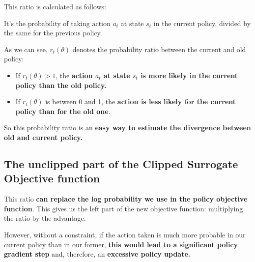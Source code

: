 \documentclass[11pt,a4paper]{article}
\begin{document}
This ratio is calculated as follows:


It's the probability of taking action \(a_t\) at state \(s_t\) in the current policy, divided by the same for the previous policy.

As we can see, \(r_t(\theta)\) denotes the probability ratio between the current and old policy:

\begin{itemize}
\tightlist
\item
  If \(r_t(\theta) > 1\), the \textbf{action \(a_t\) at state \(s_t\) is more likely in the current policy than the old policy.}
\item
  If \(r_t(\theta)\) is between 0 and 1, the \textbf{action is less likely for the current policy than for the old one}.
\end{itemize}

So this probability ratio is an \textbf{easy way to estimate the divergence between old and current policy.}

\subsection{The unclipped part of the Clipped Surrogate Objective function}\label{the-unclipped-part-of-the-clipped-surrogate-objective-function}


This ratio \textbf{can replace the log probability we use in the policy objective function}. This gives us the left part of the new objective function: multiplying the ratio by the advantage.


However, without a constraint, if the action taken is much more probable in our current policy than in our former, \textbf{this would lead to a significant policy gradient step} and, therefore, an \textbf{excessive policy update.}
\end{document}
